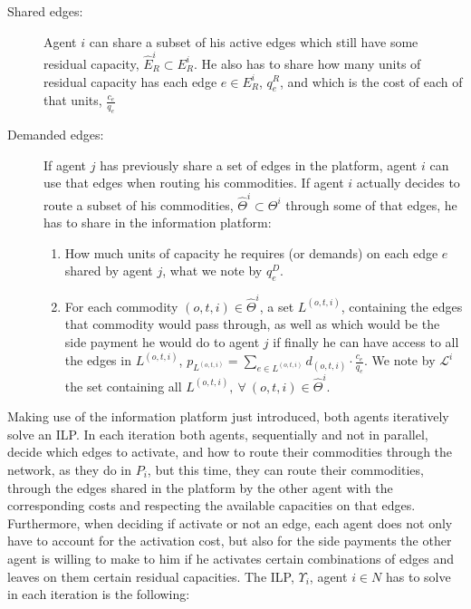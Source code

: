 \documentclass[review]{elsarticle}
\begin{document}
\begin{description}
	\item[Shared edges:] Agent $i$ can share a subset of his active edges which still have some residual capacity, $\widehat{E}_R^i\subset E_R^i$. He also has to share how many units of residual capacity has each edge $e\in E_R^i$, $q_e^R$, and which is the cost of each of that units, $\frac{c_e}{q_e}$
	\item[Demanded edges:] If agent $j$ has previously share a set of edges in the platform, agent $i$ can use that edges when routing his commodities. If agent $i$ actually decides to route a subset of his commodities, $\widehat{\Theta}^i\subset \Theta ^i$ through some of that edges, he has to share in the information platform:
	\begin{enumerate}
		\item How much units of capacity he requires (or demands) on each edge $e$ shared by agent $j$, what we note by $q_e^D$.
	\item For each commodity $(o,t,i)\in \widehat{\Theta}^i$, a set $L^{(o,t,i)}$, containing the edges that commodity would pass through, as well as which would be the side payment he would do to agent $j$ if finally he can have access to all the edges in $L^{(o,t,i)}$, $p_{L^{(o,t,i)}}=\sum_{e \in L^{(o,t,i)}} d_{(o,t,i)}\cdot \frac{c_e}{q_e}$. We note by $\mathcal{L}^i$ the set containing all $L^{(o,t,i)},\ \forall\ (o,t,i) \in \widehat{\Theta}^i$.
	\end{enumerate}
\end{description}	

Making use of the information platform just introduced, both agents iteratively solve an ILP. In each iteration both agents, sequentially and not in parallel, decide which edges to activate, and how to route their commodities through the network, as they do in $P_i$, but this time, they can route their commodities, through the edges shared in the platform by the other agent with the corresponding costs and respecting the available capacities on that edges. Furthermore, when deciding if activate or not an edge, each agent does not only have to account for the activation cost, but also for the side payments the other agent is willing to make to him if he activates certain combinations of edges and leaves on them certain residual capacities. The ILP, $\Upsilon_i$, agent $i\in N$ has to solve in each iteration is the following:
\end{document}
